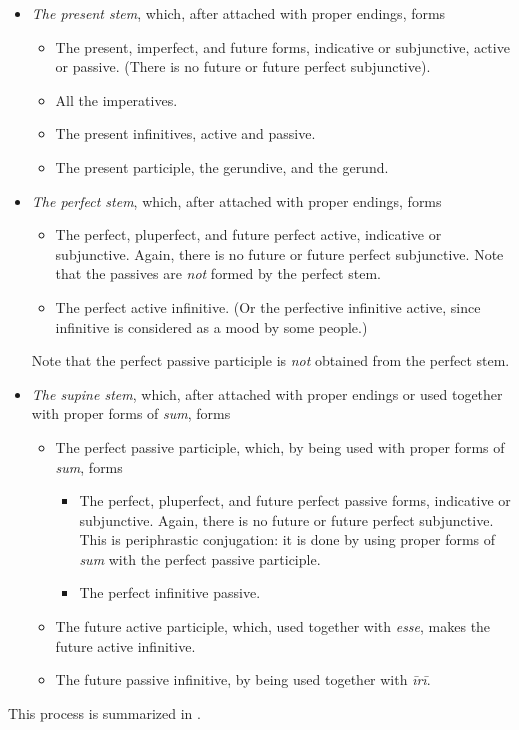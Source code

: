 \documentclass{article}
\newcommand*{\corpus}[1]{\emph{#1}}
\begin{document}
\begin{itemize}
    \item \emph{The present stem}, which, after attached with proper endings, forms
    \begin{itemize}
        \item The present, imperfect, and future forms, indicative or subjunctive,
        active or passive. (There is no future or future perfect subjunctive).
        \item All the imperatives.
        \item The present infinitives, active and passive.
        \item The present participle, the gerundive, and the gerund.
    \end{itemize}
    \item \emph{The perfect stem}, which, after attached with proper endings, forms 
    \begin{itemize}
        \item The perfect, pluperfect, and future perfect active, indicative or subjunctive.
        Again, there is no future or future perfect subjunctive.
        Note that the passives are \emph{not} formed by the perfect stem.
        \item The perfect active infinitive. 
        (Or the perfective infinitive active, since infinitive is considered as a mood by some people.)
    \end{itemize}
    Note that the perfect passive participle is \emph{not} obtained from the perfect stem.
    \item \emph{The supine stem}, 
    which, after attached with proper endings or used together with proper forms of \corpus{sum},
    forms 
    \begin{itemize}
        \item The perfect passive participle, which, by being used with proper forms of \corpus{sum}, forms
        \begin{itemize}
            \item The perfect, pluperfect, and future perfect passive forms, indicative or subjunctive.
            Again, there is no future or future perfect subjunctive.
            This is periphrastic conjugation: it is done by using proper forms of \corpus{sum}
            with the perfect passive participle.
            \item The perfect infinitive passive.
        \end{itemize}
        \item The future active participle, which, used together with \corpus{esse},
        makes the future active infinitive.
        \item The future passive infinitive, by being used together with \corpus{īrī}.
    \end{itemize}
\end{itemize}
This process is summarized in .
\end{document}
